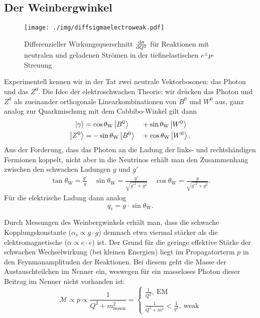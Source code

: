 \subsection{Der Weinbergwinkel}
\begin{figure}
	\centering
	\texttt{[image: ./img/diffsigmaelectroweak.pdf]}
	\caption{Differenzieller Wirkungsquerschnitt $\diff[\sigma]{Q^2}$ für Reaktionen mit neutralen und geladenen Strömen in der tiefinelastischen $e^\pm p$-Streuung}
	\label{fig:diffsigmaelectroweak}
\end{figure}
Experimentell kennen wir in der Tat zwei neutrale Vektorbosonen: das Photon und das $Z^0$.
Die Idee der elektroschwachen Theorie: wir drücken das Photon und $Z^0$ als zueinander orthogonale Linearkombinationen von $B^0$ und $W^0$ aus,
ganz analog zur Quarkmischung mit dem Cabbibo-Winkel gilt dann
\begin{alignat*}{3}
	\ket{\gamma} &= \cos\theta_\text{W}\ket{B^0} &&+ \sin\theta_\text{W}\ket{W^0} \\
	\ket{Z^0} &= -\sin\theta_\text{W}\ket{B^0} &&+ \cos\theta_\text{W}\ket{W^0}.
\end{alignat*}
Aus der Forderung, dass das Photon an die Ladung der links- und rechtshändigen Fermionen koppelt, nicht aber in die Neutrinos erhält man den Zusammenhang zwischen den schwachen Ladungen $g$ und $g'$
\begin{gather*}
	\tan\theta_\text{W} = \frac{g'}{g}\quad\sin\theta_\text{W}=\frac{g'}{\sqrt{g'^2 + g^2}}\quad\cos\theta_\text{W}=\frac{g}{\sqrt{g'^2 + g^2}}.
\end{gather*}
Für die elektrische Ladung dann analog
\begin{equation*}
	q_e = g\cdot\sin\theta_\text{W}.
\end{equation*}

Durch Messungen des Weinbergwinkels erhält man, dass die schwache Kopplungskonstante ($\alpha_\text{s}\propto g\cdot g$) demnach etwa viermal stärker als die elektromagnetische ($\alpha\propto e\cdot e$) ist.
Der Grund für die geringe effektive Stärke der schwachen Wechselwirkung (bei kleinen Energien) liegt im Propagatorterm $p$ in den Feynmanamplituden der Reaktionen.
Bei diesem geht die Masse der Austauschteilchen im Nenner ein, weswegen für ein masseloses Photon dieser Beitrag im Nenner nicht vorhanden ist:
\begin{equation*}
	\mathcal{M}\propto p\propto \frac{1}{Q^2 + m^2_\text{boson}} =
	\begin{cases}
		\frac{1}{Q^2},\ \text{EM} \\
		\frac{1}{Q^2 + m^2}<\frac{1}{q^2},\ \text{weak}
	\end{cases}
\end{equation*}

